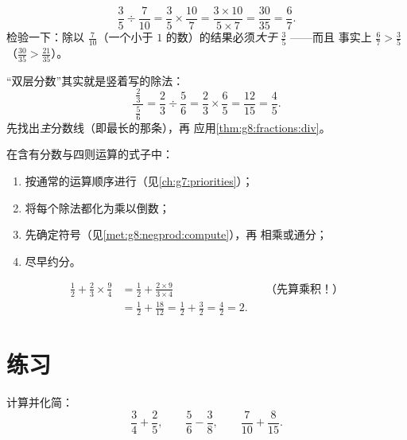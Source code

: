 \begin{example}\label{ex:g8:fractions:div}
\[
\frac{3}{5} \div \frac{7}{10}
= \frac{3}{5} \times \frac{10}{7}
= \frac{3 \times 10}{5 \times 7}
= \frac{30}{35} = \frac{6}{7}.
\]
检验一下：除以 $\frac{7}{10}$（一个小于
$1$ 的数）的结果必须\emph{大于} $\frac35$ ——而且
事实上 $\frac67 > \frac35$（$\frac{30}{35} > \frac{21}{35}$）。
\end{example}

\begin{example}[分数线中的分数线]\label{ex:g8:fractions:complex}
“双层分数”其实就是竖着写的除法：
\[
\frac{\ \frac{2}{3}\ }{\ \frac{5}{6}\ }
= \frac{2}{3} \div \frac{5}{6}
= \frac{2}{3} \times \frac{6}{5}
= \frac{12}{15} = \frac{4}{5}.
\]
先找出\emph{主}分数线（即最长的那条），再
应用\cref{thm:g8:fractions:div}。
\end{example}

\begin{method}[混合运算]\label{met:g8:fractions:mixed}
在含有分数与四则运算的式子中：
\begin{enumerate}
  \item 按通常的运算顺序进行（见\cref{ch:g7:priorities}）；
  \item 将每个除法都化为乘以倒数；
  \item 先确定符号（见\cref{met:g8:negprod:compute}），再
        相乘或通分；
  \item 尽早约分。
\end{enumerate}
\end{method}

\begin{example}\label{ex:g8:fractions:mixed}
\begin{align*}
\frac12 + \frac{2}{3} \times \frac{9}{4}
&= \frac12 + \frac{2 \times 9}{3 \times 4}
&& \text{（先算乘积！）} \\
&= \frac12 + \frac{18}{12} = \frac12 + \frac32
= \frac{4}{2} = 2 .
\end{align*}
\end{example}

\section{练习}

\begin{exercise}[$\star$]\label{exo:g8:fractions:1}
计算并化简：
\[
\frac{3}{4} + \frac{2}{5}, \qquad
\frac{5}{6} - \frac{3}{8}, \qquad
\frac{7}{10} + \frac{8}{15} .
\]
\end{exercise}

